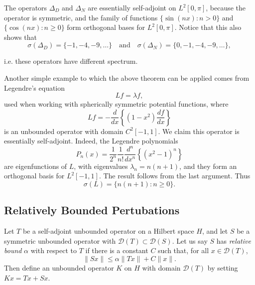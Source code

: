 \begin{example}
    The operators $\Delta_D$ and $\Delta_N$ are essentially self-adjoint on $L^2[0,\pi]$, because the operator is symmetric, and the family of functions $\{ \sin(nx) : n > 0 \}$ and $\{ \cos(nx) : n \geq 0 \}$ form orthogonal bases for $L^2[0,\pi]$. Notice that this also shows that
    \[ \sigma(\Delta_D) = \{ -1, -4, -9, \dots \} \quad\text{and}\quad \sigma(\Delta_N) = \{ 0, -1, -4, -9, \dots \}, \]
    
    i.e. these operators have different spectrum.
\end{example}

\begin{example}
    Another simple example to which the above theorem can be applied comes from Legendre's equation
    \[ Lf = \lambda f, \]
    used when working with spherically symmetric potential functions, where
    \[ Lf = - \frac{d}{dx} \left\{ (1 - x^2) \frac{df}{dx} \right\} \]
    is an unbounded operator with domain $C^2[-1,1]$. We claim this operator is essentially self-adjoint. Indeed, the Legendre polynomials
    \[ P_n(x) = \frac{1}{2^n} \frac{1}{n!} \frac{d^n}{dx^n} \left\{ (x^2 - 1)^n \right\} \]
    are eigenfunctions of $L$, with eigenvalues $\lambda_n = n(n+1)$, and they form an orthogonal basis for $L^2[-1,1]$. The result follows from the last argument. Thus
    \[ \sigma(L) = \{ n(n+1): n \geq 0 \}. \]
\end{example}

\subsection{Relatively Bounded Pertubations}

Let $T$ be a self-adjoint unbounded operator on a Hilbert space $H$, and let $S$ be a symmetric unbounded operator with $\mathcal{D}(T) \subset \mathcal{D}(S)$. Let us say $S$ has \emph{relative bound} $\alpha$ with respect to $T$ if there is a constant $C$ such that, for all $x \in \mathcal{D}(T)$,
%
\[ \| Sx \| \leq \alpha \| Tx \| + C \| x \|. \]
%
Then define an unbounded operator $K$ on $H$ with domain $\mathcal{D}(T)$ by setting $Kx = Tx + Sx$.

